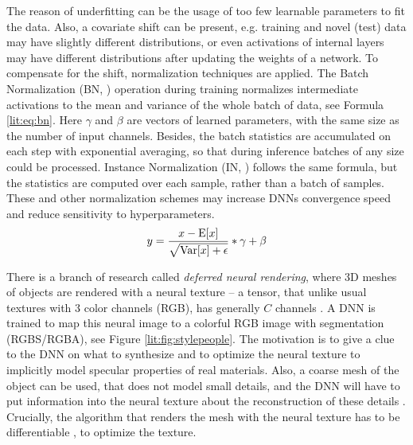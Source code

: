 The reason of underfitting can be the usage of too few learnable parameters to fit the data. Also, a covariate shift can be present, e.g. training and novel (test) data may have slightly different distributions, or even activations of internal layers may have different distributions after updating the weights of a network. To compensate for the shift, normalization techniques are applied. The Batch Normalization (BN, \cite{dnn:bn15}) operation during training normalizes intermediate activations to the mean and variance of the whole batch of data, see Formula \ref{lit:eq:bn}. Here $\gamma$ and $\beta$ are vectors of learned parameters, with the same size as the number of input channels. Besides, the batch statistics are accumulated on each step with exponential averaging, so that during inference batches of any size could be processed. Instance Normalization (IN, \cite{dnn:in16}) follows the same formula, but the statistics are computed over each sample, rather than a batch of samples. These and other normalization schemes may increase DNNs convergence speed and reduce sensitivity to hyperparameters.
\begin{equation}
	\setlength\abovedisplayskip{2pt}y = \frac{x - \mathrm{E}[x]}{\sqrt{\mathrm{Var}[x] + \epsilon}} * \gamma + \beta
	\setlength\belowdisplayskip{2pt}
	\label{lit:eq:bn}
\end{equation}

There is a branch of research called \textit{deferred neural rendering}, where 3D meshes of objects are rendered with a neural texture -- a tensor, that unlike usual textures with 3 color channels (RGB), has generally $C$ channels \cite{dnn:deferred19}. A DNN is trained to map this neural image to a colorful RGB image with segmentation (RGBS/RGBA), see Figure \ref{lit:fig:stylepeople}. The motivation is to give a clue to the DNN on what to synthesize and to optimize the neural texture to implicitly model specular properties of real materials. Also, a coarse mesh of the object can be used, that does not model small details, and the DNN will have to put information into the neural texture about the reconstruction of these details \cite{dnn:stylepeople21, dnn:anr21}. Crucially, the algorithm that renders the mesh with the neural texture has to be differentiable \cite{survey:diff-render20}, to optimize the texture.


